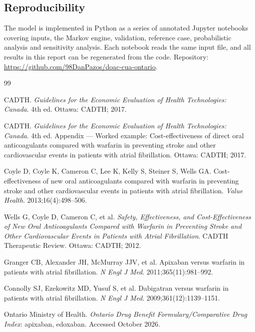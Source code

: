 \documentclass[11pt,letterpaper]{article}
\newcommand{\repourl}{\url{https://github.com/98DanPazos/doac-cua-ontario}}
\begin{document}
\subsection*{Reproducibility}

The model is implemented in Python as a series of annotated Jupyter notebooks covering inputs, the
Markov engine, validation, reference case, probabilistic analysis and sensitivity analysis. Each
notebook reads the same input file, and all results in this report can be regenerated from the
code. Repository: \repourl.

\begin{thebibliography}{99}
\small

CADTH. \textit{Guidelines for the Economic Evaluation of Health Technologies: Canada}. 4th ed.
Ottawa: CADTH; 2017.

CADTH. \textit{Guidelines for the Economic Evaluation of Health Technologies: Canada}. 4th ed.
Appendix --- Worked example: Cost-effectiveness of direct oral anticoagulants compared with warfarin
in preventing stroke and other cardiovascular events in patients with atrial fibrillation. Ottawa:
CADTH; 2017.

Coyle D, Coyle K, Cameron C, Lee K, Kelly S, Steiner S, Wells GA. Cost-effectiveness of new oral
anticoagulants compared with warfarin in preventing stroke and other cardiovascular events in
patients with atrial fibrillation. \textit{Value Health}. 2013;16(4):498--506.

Wells G, Coyle D, Cameron C, et al. \textit{Safety, Effectiveness, and Cost-Effectiveness of New
Oral Anticoagulants Compared with Warfarin in Preventing Stroke and Other Cardiovascular Events in
Patients with Atrial Fibrillation}. CADTH Therapeutic Review. Ottawa: CADTH; 2012.

Granger CB, Alexander JH, McMurray JJV, et al. Apixaban versus warfarin in patients with atrial
fibrillation. \textit{N Engl J Med}. 2011;365(11):981--992.

Connolly SJ, Ezekowitz MD, Yusuf S, et al. Dabigatran versus warfarin in patients with atrial
fibrillation. \textit{N Engl J Med}. 2009;361(12):1139--1151.

Ontario Ministry of Health. \textit{Ontario Drug Benefit Formulary/Comparative Drug Index}:
apixaban, edoxaban. Accessed October 2026.


\end{thebibliography}
\end{document}
